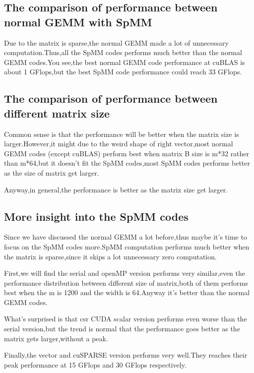 \documentclass[11pt]{scrartcl} %
\begin{document}
\subsection{The comparison of performance between normal GEMM with SpMM}
Due to the matrix is sparse,the normal GEMM made a lot of unnecessary computation.Thus,all the SpMM codes performs much better than the normal GEMM codes.You see,the best normal GEMM code performance at cuBLAS is about 1 GFlops,but the best SpMM code performance could reach 33 GFlops.
\subsection{The comparison of performance between different matrix size}
Common sense is that the performance will be better when the matrix size is larger.However,it might due to the weird shape of right vector,most normal GEMM codes (except cuBLAS) perform best when matrix B size is m*32 rather than m*64,but it doesn't fit the SpMM codes,most SpMM codes performs better as the size of matrix get larger.

Anyway,in general,the performance is better as the matrix size get larger.
\subsection{More insight into the SpMM codes}
Since we have discussed the normal GEMM a lot before,thus maybe it's time to focus on the SpMM codes more.SpMM computation performs much better when the matrix is sparse,since it skips a lot unnecessary zero computation.

First,we will find the serial and openMP version performs very similar,even the performance distribution between different size of matrix,both of them performs best when the m is 1200 and the width is 64.Anyway it's better than the normal GEMM codes.

What's surprised is that csr CUDA scalar version performs even worse than the serial version,but the trend is normal that the performance goes better as the matrix gets larger,without a peak.

Finally,the vector and cuSPARSE version performs very well.They reaches their peak performance at 15 GFlops and 30 GFlops respectively.
\end{document}
